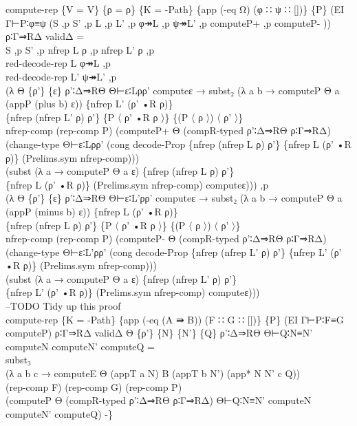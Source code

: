 {\begin{code}
{\>compute-rep \{V = V\} \{ρ = ρ\} \{K = -Path\} \{app (-eq Ω) (φ ∷ ψ ∷ [])\} \{P\} (EI Γ⊢P∶φ≡ψ (S ,p S' ,p L ,p L' ,p φ↠L ,p ψ↠L' ,p computeP+ ,p computeP- )) ρ∶Γ⇒RΔ validΔ = \<\\
\>  S ,p S' ,p nfrep L ρ ,p nfrep L' ρ ,p \<\\
\>  red-decode-rep L φ↠L ,p\<\\
\>  red-decode-rep L' ψ↠L' ,p \<\\
\>  (λ Θ \{ρ'\} \{ε\} ρ'∶Δ⇒RΘ Θ⊢ε∶Lρρ' computeε → subst₂ (λ a b → computeP Θ a (appP (plus b) ε)) \{nfrep L' (ρ' •R ρ)\}\<\\
\>                                              \{nfrep (nfrep L' ρ) ρ'\} \{P 〈 ρ' •R ρ 〉\} \{(P 〈 ρ 〉) 〈 ρ' 〉\} \<\\
\>  nfrep-comp (rep-comp P) (computeP+ Θ (compR-typed ρ'∶Δ⇒RΘ ρ∶Γ⇒RΔ) \<\\
\>    (change-type Θ⊢ε∶Lρρ' (cong decode-Prop \{nfrep (nfrep L ρ) ρ'\} \{nfrep L (ρ' •R ρ)\} (Prelims.sym nfrep-comp))) \<\\
\>    (subst (λ a → computeP Θ a ε) \{nfrep (nfrep L ρ) ρ'\}\<\\
\>       \{nfrep L (ρ' •R ρ)\} (Prelims.sym nfrep-comp) computeε))) ,p \<\\
\>  (λ Θ \{ρ'\} \{ε\} ρ'∶Δ⇒RΘ Θ⊢ε∶L'ρρ' computeε → subst₂ (λ a b → computeP Θ a (appP (minus b) ε)) \{nfrep L (ρ' •R ρ)\}\<\\
\>                                              \{nfrep (nfrep L ρ) ρ'\} \{P 〈 ρ' •R ρ 〉\} \{(P 〈 ρ 〉) 〈 ρ' 〉\} \<\\
\>  nfrep-comp (rep-comp P) (computeP- Θ (compR-typed ρ'∶Δ⇒RΘ ρ∶Γ⇒RΔ) \<\\
\>    (change-type Θ⊢ε∶L'ρρ' (cong decode-Prop \{nfrep (nfrep L' ρ) ρ'\} \{nfrep L' (ρ' •R ρ)\} (Prelims.sym nfrep-comp))) \<\\
\>    (subst (λ a → computeP Θ a ε) \{nfrep (nfrep L' ρ) ρ'\}\<\\
\>       \{nfrep L' (ρ' •R ρ)\} (Prelims.sym nfrep-comp) computeε)))\<\\
\>--TODO Tidy up this proof\<\\
\>compute-rep \{K = -Path\} \{app (-eq (A ⇛ B)) (F ∷ G ∷ [])\} \{P\} (EI Γ⊢P∶F≡G computeP) ρ∶Γ⇒RΔ validΔ Θ \{ρ'\} \{N\} \{N'\} \{Q\} ρ'∶Δ⇒RΘ Θ⊢Q∶N≡N' computeN computeN' computeQ = \<\\
\>  subst₃\<\\
\>    (λ a b c → computeE Θ (appT a N) B (appT b N') (app* N N' c Q)) \<\\
\>    (rep-comp F) (rep-comp G) (rep-comp P) \<\\
\>    (computeP Θ (compR-typed ρ'∶Δ⇒RΘ ρ∶Γ⇒RΔ) Θ⊢Q∶N≡N' computeN computeN' computeQ) -\}}\<%
\end{code}
}

